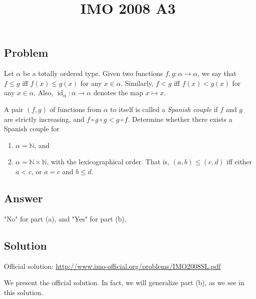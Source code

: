 \documentclass{article}
\title{IMO 2008 A3}
\author{}
\date{}
\newcommand{\N}{\mathbb{N}}
\DeclareMathOperator{\id}{id}
\begin{document}
\maketitle

\subsection*{Problem}

Let $\alpha$ be a totally ordered type.
Given two functions $f, g : \alpha \to \alpha$, we say that $f \leq g$ iff $f(x) \leq g(x)$ for any $x \in \alpha$.
Similarly, $f < g$ iff $f(x) < g(x)$ for any $x \in \alpha$.
Also, $\id_{\alpha} : \alpha \to \alpha$ denotes the map $x \mapsto x$.

A pair $(f, g)$ of functions from $\alpha$ to itself is called a \emph{Spanish couple} if $f$ and $g$ are strictly increasing, and $f \circ g \circ g < g \circ f$.
Determine whether there exists a Spanish couple for
\begin{enumerate}[label=(\alph*)]
    \item   $\alpha = \N$, and
    \item   $\alpha = \N \times \N$, with the lexicographical order.
            That is, $(a, b) \leq (c, d)$ iff either $a < c$, or $a = c$ and $b \leq d$.
\end{enumerate}



\subsection*{Answer}

"No" for part (a), and "Yes" for part (b).



\subsection*{Solution}

Official solution: \url{http://www.imo-official.org/problems/IMO2008SL.pdf}

We present the official solution.
In fact, we will generalize part (b), as we see in this solution.
\end{document}
